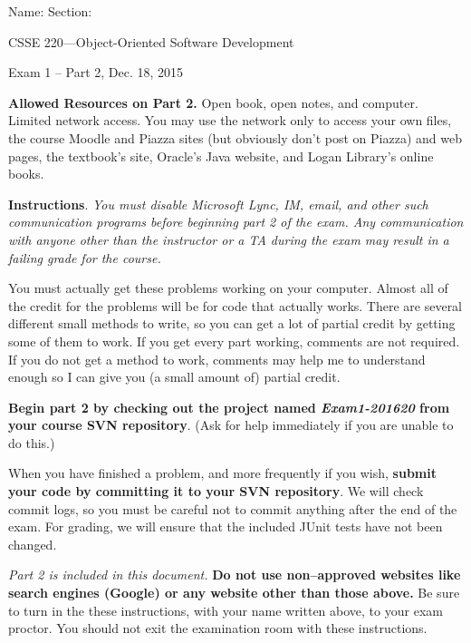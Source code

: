 \documentclass[12pt,twoside]{article}
\newcommand{\fillInBlank}[1][0.5in]{\underline{\hspace{#1}}}
\begin{document}

\begin{flushright}
Name: \fillInBlank[3in] Section: \fillInBlank[1in]

\LARGE{CSSE 220---Object-Oriented Software Development}

\Large{Exam 1 -- Part 2, Dec. 18, 2015}
\end{flushright}

\textbf{Allowed Resources on Part 2.} \hspace{0.15in}
Open book, open notes, and computer. Limited network access. You may use the network only to access your own files, the course Moodle and Piazza sites (but obviously don't post on Piazza) and web pages, the textbook's site, Oracle's Java website, and Logan Library's online books.


\textbf{Instructions}.\hspace{0.15in}
\emph{You must disable Microsoft Lync, IM, email, and other such communication programs before beginning part 2 of the exam. Any communication with anyone other than the instructor or a TA during the exam may result in a failing grade for the course.}

You must actually get these problems working on your computer. Almost all of the credit for the problems will be for code that actually works. There are several different small methods to write, so you can get a lot of partial credit by getting some of them to work.  If you get every part working, comments are not required.  If you do not get a method to work, comments may help me to understand enough so I can give you (a small amount of) partial credit.  

\textbf{Begin part 2 by checking out the project named \emph{Exam1-201620} from your course SVN repository}.  (Ask for help immediately if you are unable to do this.)

When you have finished a problem, and more frequently if you wish, \textbf{submit your code by committing it to your SVN repository}.  We will check commit logs, so you must be careful not to commit anything after the end of the exam.  For grading, we will ensure that the included JUnit tests have not been changed.

\emph{Part 2 is included in this document.}
\textbf{Do not use non--approved websites like search engines (Google) or any website other than those above.}  Be sure to turn in the these instructions, with your name written above, to your exam proctor. You should not exit the examination room with these instructions.
\end{document}
